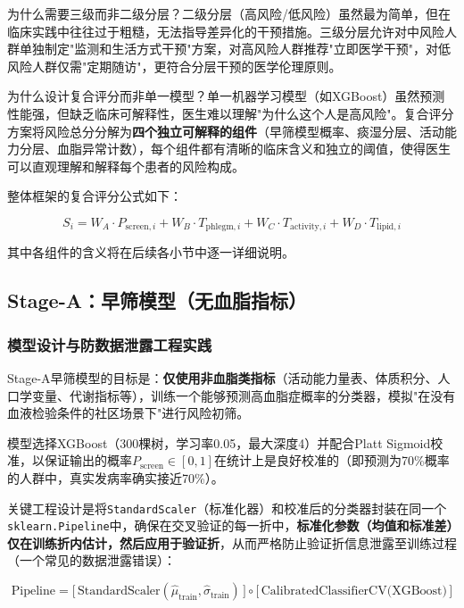 \documentclass[12pt,a4paper]{ctexart}
\begin{document}
为什么需要三级而非二级分层？二级分层（高风险/低风险）虽然最为简单，但在临床实践中往往过于粗糙，无法指导差异化的干预措施。三级分层允许对中风险人群单独制定"监测和生活方式干预"方案，对高风险人群推荐"立即医学干预"，对低风险人群仅需"定期随访"，更符合分层干预的医学伦理原则。

为什么设计复合评分而非单一模型？单一机器学习模型（如XGBoost）虽然预测性能强，但缺乏临床可解释性，医生难以理解"为什么这个人是高风险"。复合评分方案将风险总分分解为\textbf{四个独立可解释的组件}（早筛模型概率、痰湿分层、活动能力分层、血脂异常计数），每个组件都有清晰的临床含义和独立的阈值，使得医生可以直观理解和解释每个患者的风险构成。

整体框架的复合评分公式如下：

\begin{equation}
S_i = W_A \cdot P_{\text{screen},i} + W_B \cdot T_{\text{phlegm},i} + W_C \cdot T_{\text{activity},i} + W_D \cdot T_{\text{lipid},i}
\label{eq:composite}
\end{equation}

其中各组件的含义将在后续各小节中逐一详细说明。

\subsection{Stage-A：早筛模型（无血脂指标）}

\subsubsection{模型设计与防数据泄露工程实践}

Stage-A早筛模型的目标是：\textbf{仅使用非血脂类指标}（活动能力量表、体质积分、人口学变量、代谢指标等），训练一个能够预测高血脂症概率的分类器，模拟"在没有血液检验条件的社区场景下"进行风险初筛。

模型选择XGBoost（300棵树，学习率0.05，最大深度4）并配合Platt Sigmoid校准，以保证输出的概率$P_{\text{screen}} \in [0, 1]$在统计上是良好校准的（即预测为70\%概率的人群中，真实发病率确实接近70\%）。

关键工程设计是将\texttt{StandardScaler}（标准化器）和校准后的分类器封装在同一个\texttt{sklearn.Pipeline}中，确保在交叉验证的每一折中，\textbf{标准化参数（均值和标准差）仅在训练折内估计，然后应用于验证折}，从而严格防止验证折信息泄露至训练过程（一个常见的数据泄露错误）：

\begin{equation}
\text{Pipeline} = \bigl[\,\text{StandardScaler}(\hat{\mu}_{\text{train}},\hat{\sigma}_{\text{train}})\,\bigr] \circ \bigl[\,\text{CalibratedClassifierCV(XGBoost)}\,\bigr]
\label{eq:pipeline}
\end{equation}
\end{document}
